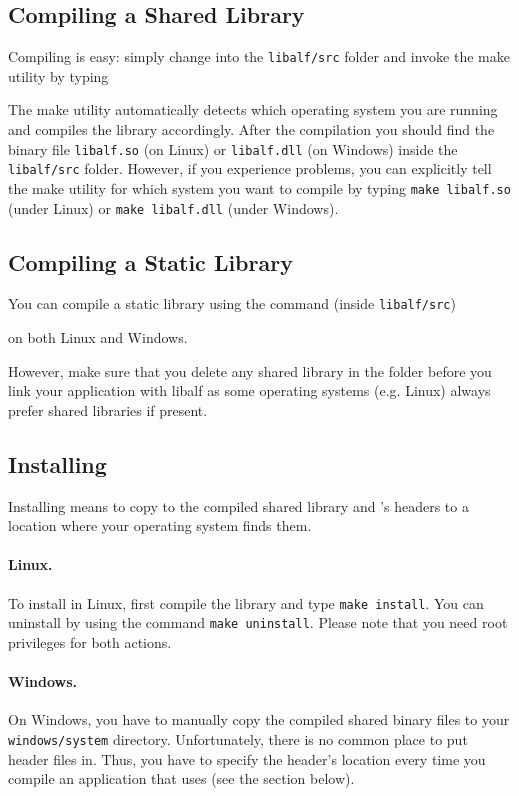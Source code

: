 \subsection*{Compiling a Shared Library}
Compiling \libalf is easy: simply change into the \texttt{libalf/src} folder and invoke the make utility by typing 


The make utility automatically detects which operating system you are running and compiles the library accordingly. After the compilation you should find the binary file \texttt{libalf.so} (on Linux) or \texttt{libalf.dll} (on Windows) inside the \texttt{libalf/src} folder. However, if you experience problems, you can explicitly tell the make utility for which system you want to compile \libalf by typing \texttt{make libalf.so} (under Linux) or \texttt{make libalf.dll} (under Windows).

\subsection*{Compiling a Static Library}
You can compile a static library using the command (inside \texttt{libalf/src})


on both Linux and Windows.

However, make sure that you delete any shared library in the folder before you link your application with libalf as some operating systems (e.g. Linux) always prefer shared libraries if present.

\subsection{Installing \libalf}
Installing \libalf means to copy to the compiled shared library and \libalf's headers to a location where your operating system finds them.

\paragraph{Linux.}
To install \libalf in Linux, first compile the library and type \texttt{make install}. You can uninstall \libalf by using the command \texttt{make uninstall}. Please note that you need root privileges for both actions.

\paragraph{Windows.}
On Windows, you have to manually copy the compiled shared binary files to your \texttt{windows/system} directory. Unfortunately, there is no common place to put header files in. Thus, you have to specify the header's location every time you compile an application that uses \libalf (see the section below).

